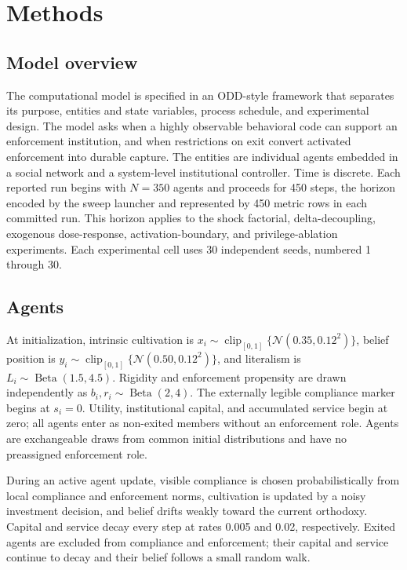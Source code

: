 \documentclass[12pt]{article}
\begin{document}

\section{Methods}

\subsection{Model overview}

The computational model is specified in an ODD-style framework that separates its purpose, entities and state variables, process schedule, and experimental design. The model asks when a highly observable behavioral code can support an enforcement institution, and when restrictions on exit convert activated enforcement into durable capture. The entities are individual agents embedded in a social network and a system-level institutional controller. Time is discrete. Each reported run begins with \(N=350\) agents and proceeds for 450 steps, the horizon encoded by the sweep launcher and represented by 450 metric rows in each committed run. This horizon applies to the shock factorial, delta-decoupling, exogenous dose-response, activation-boundary, and privilege-ablation experiments. Each experimental cell uses 30 independent seeds, numbered 1 through 30.

\subsection{Agents}

At initialization, intrinsic cultivation is \(x_i\sim\operatorname{clip}_{[0,1]}\{\mathcal{N}(0.35,0.12^2)\}\), belief position is \(y_i\sim\operatorname{clip}_{[0,1]}\{\mathcal{N}(0.50,0.12^2)\}\), and literalism is \(L_i\sim\operatorname{Beta}(1.5,4.5)\). Rigidity and enforcement propensity are drawn independently as \(b_i,r_i\sim\operatorname{Beta}(2,4)\). The externally legible compliance marker begins at \(s_i=0\). Utility, institutional capital, and accumulated service begin at zero; all agents enter as non-exited members without an enforcement role. Agents are exchangeable draws from common initial distributions and have no preassigned enforcement role.

During an active agent update, visible compliance is chosen probabilistically from local compliance and enforcement norms, cultivation is updated by a noisy investment decision, and belief drifts weakly toward the current orthodoxy. Capital and service decay every step at rates 0.005 and 0.02, respectively. Exited agents are excluded from compliance and enforcement; their capital and service continue to decay and their belief follows a small random walk.
\end{document}
